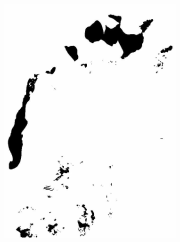 \documentclass[12pt,a4paper]{article}
\begin{document}
\begin{figure}
\begin{subfigure}[b]{0.19\textwidth}
        \includegraphics[width=\textwidth]{../img/2019w.jpg}
    \end{subfigure}
    \begin{subfigure}[b]{0.19\textwidth}
        \centering

\end{subfigure}
\end{figure}
\end{document}
